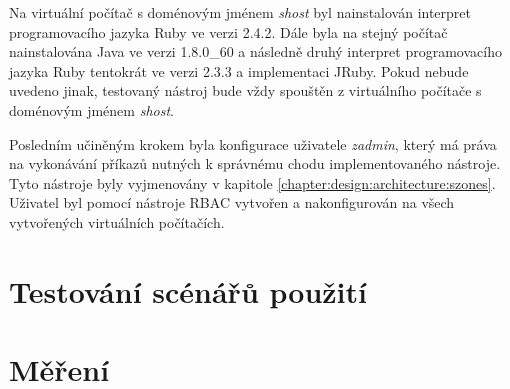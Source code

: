 Na virtuální počítač s doménovým jménem \textit{shost} byl nainstalován interpret programovacího jazyka Ruby ve verzi 2.4.2.
Dále byla na stejný počítač nainstalována Java ve verzi 1.8.0\_60 a následně druhý interpret programovacího jazyka Ruby
tentokrát ve verzi 2.3.3 a implementaci JRuby. Pokud nebude uvedeno jinak, testovaný nástroj bude vždy spouštěn z virtuálního
počítače s doménovým jménem \textit{shost}.

Posledním učiněným krokem byla konfigurace uživatele \textit{zadmin}, který má práva na vykonávání příkazů nutných k správnému
chodu implementovaného nástroje. Tyto nástroje byly vyjmenovány v kapitole \ref{chapter:design:architecture:szones}. Uživatel 
byl pomocí nástroje RBAC vytvořen a nakonfigurován na všech vytvořených virtuálních počítačích.
\section{Testování scénářů použití}
\section{Měření}